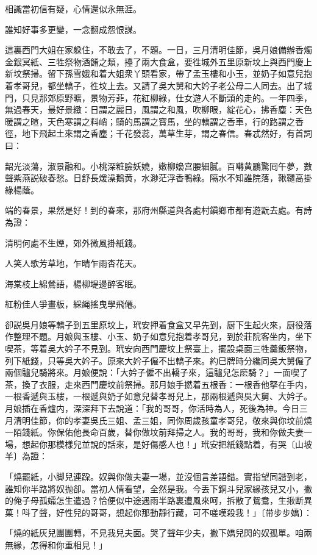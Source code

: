 \begin{myquote}
相識當初信有疑，心情還似永無涯。

誰知好事多更變，一念翻成怨恨謀。
\end{myquote}

這裏西門大姐在家躱住，不敢去了，不題。一日，三月清明佳節，吳月娘備辦香燭金銀冥紙、三牲祭物酒餚之類，擡了兩大食盒，要徃城外五里原新坟上與西門慶上新坟祭掃。留下孫雪娥和着大姐衆丫頭看家，帶了孟玉樓和小玉，並奶子如意兒抱着孝哥兒，都坐轎子，徃坟上去。又請了吳大舅和大妗子老公母二人同去。出了城門，只見那郊原野曠，景物芳菲，花紅柳綠，仕女遊人不斷頭的走的。一年四季，無過春天，最好景緻：日謂之麗日，風謂之和風，吹柳眼，綻花心，拂香塵：天色暖謂之暄，天色寒謂之料峭；騎的馬謂之寳馬，坐的轎謂之香車，行的路謂之香徑，地下飛起土來謂之香塵；千花發蕊，萬草生芽，謂之春信。春忒然好，有首詞曰：

\begin{myquote}
韶光淡蕩，淑景融和。小桃深粧臉妖嬈，嫩柳嬝宫腰細膩。百囀黄鸝驚囘午夢，數聲紫燕説破春愁。日舒長煖澡鵝黄，水渺茫浮香鴨綠。隔水不知誰院落，鞦韆高掛綠楊蔭。
\end{myquote}

端的春景，果然是好！到的春來，那府州縣道與各處村鎭鄉市都有遊翫去處。有詩為證：

\begin{myquote}
清明何處不生煙，郊外微風掛紙錢。

人笑人歌芳草地，乍晴乍雨杏花天。

海棠枝上綿鶯語，楊柳堤邊醉客眠。

紅粉佳人爭畫板，綵䋲搖曳學飛僊。
\end{myquote}

卻説吳月娘等轎子到五里原坟上，玳安押着食盒又早先到，厨下生起火來，厨役落作整理不題。月娘與玉樓、小玉、奶子如意兒抱着孝哥兒，到於莊院客坐内，坐下喫茶，等着吳大妗子不見到。玳安向西門慶坟上祭臺上，擺設桌面三牲羹飯祭物，列下紙錢，只等吳大妗子。原來大妗子僱不出轎子來。約巳牌時分纔同吳大舅僱了兩個驢兒騎將來。月娘便說：「大妗子僱不出轎子來，這驢兒怎麽騎？」一面喫了茶，換了衣服，走來西門慶坟前祭掃。那月娘手撚着五根香：一根香他拏在手内，一根香遞與玉樓，一根遞與奶子如意兒替孝哥兒上，那兩根遞與吳大舅、大妗子。月娘插在香爐内，深深拜下去說道：「我的哥哥，你活時為人，死後為神。今日三月清明佳節，你的孝妻吳氏三姐、孟三姐，同你周歲孩童孝哥兒，敬來與你坟前燒一陌錢紙。你保佑他長命百歲，替你做坟前拜掃之人。我的哥哥，我和你做夫妻一場，想起你那模樣兒並說的話來，是好傷感人也！」玳安把紙錢點着，有哭〔山坡羊〕為證：

\begin{myquote}
「燒罷紙，小脚兒連跥。奴與你做夫妻一場，並沒個言差語錯。實指望同諧到老，誰知你半路將奴抛卻。當初人情看望，全然是我。今丢下銅斗兒家緣孩兒又小，撇的俺子母孤孀怎生遣過？恰便似中途遇雨半路裏遭風來呵，拆散了鴛鴦，生揪断異菓！呌了聲，好性兒的哥哥，想起你那動靜行藏，可不嗟嘆殺我！」{\marktext\small〔带步步嬌〕}：

「燒的紙灰兒團團轉，不見我兒夫面。哭了聲年少夫，撇下嬌兒閃的奴孤單。咱兩無緣，怎得和你重相見！」
\end{myquote}

